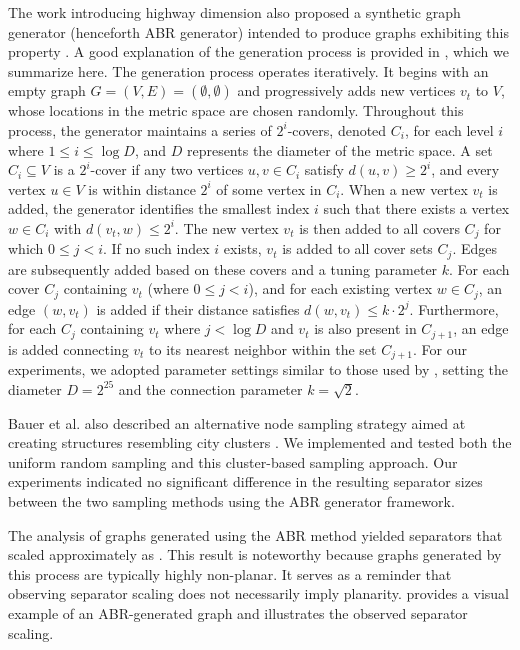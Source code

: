 The work introducing highway dimension also proposed a synthetic graph generator (henceforth ABR generator) intended to produce graphs exhibiting this property \cite{abraham_highway_2010}.
A good explanation of the generation process is provided in \cite{hutchison_synthetic_2010}, which we summarize here.
The generation process operates iteratively.
It begins with an empty graph \( G = (V, E) = (\emptyset, \emptyset) \) and progressively adds new vertices \(v_t\) to \(V\), whose locations in the metric space are chosen randomly.
Throughout this process, the generator maintains a series of \(2^i\)-covers, denoted \(C_i\), for each level \(i\) where \(1 \leq i \leq \log D\), and \(D\) represents the diameter of the metric space.
A set \(C_i \subseteq V\) is a \(2^i\)-cover if any two vertices \(u, v \in C_i\) satisfy \(d(u, v) \geq 2^i\), and every vertex \(u \in V\) is within distance \(2^i\) of some vertex in \(C_i\).
When a new vertex \(v_t\) is added, the generator identifies the smallest index \(i\) such that there exists a vertex \(w \in C_i\) with \(d(v_t, w) \leq 2^i\).
The new vertex \(v_t\) is then added to all covers \(C_j\) for which \(0 \leq j < i\).
If no such index \(i\) exists, \(v_t\) is added to all cover sets \(C_j\).
Edges are subsequently added based on these covers and a tuning parameter \(k\).
For each cover \(C_j\) containing \(v_t\) (where \(0 \leq j < i\)), and for each existing vertex \(w \in C_j\), an edge \((w, v_t)\) is added if their distance satisfies \(d(w, v_t) \leq k \cdot 2^j\).
Furthermore, for each \(C_j\) containing \(v_t\) where \(j < \log D\) and \(v_t\) is also present in \(C_{j+1}\), an edge is added connecting \(v_t\) to its nearest neighbor within the set \(C_{j+1}\). %
For our experiments, we adopted parameter settings similar to those used by \cite{hutchison_synthetic_2010}, setting the diameter \(D = 2^{25}\) and the connection parameter \(k = \sqrt{2}\).

Bauer et al. also described an alternative node sampling strategy aimed at creating structures resembling city clusters \cite{hutchison_synthetic_2010}.
We implemented and tested both the uniform random sampling and this cluster-based sampling approach.
Our experiments indicated no significant difference in the resulting separator sizes between the two sampling methods using the ABR generator framework.

The analysis of graphs generated using the ABR method yielded separators that scaled approximately as .
This result is noteworthy because graphs generated by this process are typically highly non-planar.
It serves as a reminder that observing  separator scaling does not necessarily imply planarity.
 provides a visual example of an ABR-generated graph and illustrates the observed separator scaling.

